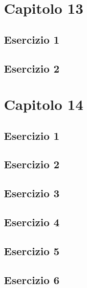 \documentclass[a4paper,12pt,oneside]{book}
\begin{document}
\hypertarget{capitolo-13}{%
\section{Capitolo 13}\label{capitolo-13}}

\hypertarget{esercizio-1-8}{%
\subsection{Esercizio 1}\label{esercizio-1-8}}

\hypertarget{esercizio-2-7}{%
\subsection{Esercizio 2}\label{esercizio-2-7}}

\hypertarget{capitolo-14}{%
\section{Capitolo 14}\label{capitolo-14}}

\hypertarget{esercizio-1-9}{%
\subsection{Esercizio 1}\label{esercizio-1-9}}

\hypertarget{esercizio-2-8}{%
\subsection{Esercizio 2}\label{esercizio-2-8}}

\hypertarget{esercizio-3-7}{%
\subsection{Esercizio 3}\label{esercizio-3-7}}

\hypertarget{esercizio-4-5}{%
\subsection{Esercizio 4}\label{esercizio-4-5}}

\hypertarget{esercizio-5-4}{%
\subsection{Esercizio 5}\label{esercizio-5-4}}

\hypertarget{esercizio-6-3}{%
\subsection{Esercizio 6}\label{esercizio-6-3}}
\end{document}

